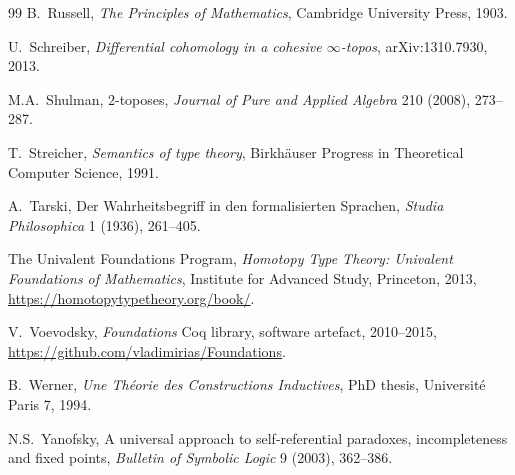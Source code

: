 \documentclass[11pt]{article}
\theoremstyle{plain}
\theoremstyle{definition}
\begin{document}
\begin{thebibliography}{99}
B.~Russell,
\newblock \emph{The Principles of Mathematics},
\newblock Cambridge University Press, 1903.

U.~Schreiber,
\newblock \emph{Differential cohomology in a cohesive $\infty$-topos},
\newblock arXiv:1310.7930, 2013.

M.A.~Shulman,
\newblock $2$-toposes,
\newblock \emph{Journal of Pure and Applied Algebra} 210 (2008), 273--287.

T.~Streicher,
\newblock \emph{Semantics of type theory},
\newblock Birkh\"auser Progress in Theoretical Computer Science, 1991.

A.~Tarski,
\newblock Der Wahrheitsbegriff in den formalisierten Sprachen,
\newblock \emph{Studia Philosophica} 1 (1936), 261--405.

The Univalent Foundations Program,
\newblock \emph{Homotopy Type Theory: Univalent Foundations of Mathematics},
\newblock Institute for Advanced Study, Princeton, 2013,
\newblock \url{https://homotopytypetheory.org/book/}.

V.~Voevodsky,
\newblock \emph{Foundations} Coq library,
\newblock software artefact, 2010--2015,
\newblock \url{https://github.com/vladimirias/Foundations}.

B.~Werner,
\newblock \emph{Une Th\'eorie des Constructions Inductives},
\newblock PhD thesis, Universit\'e Paris 7, 1994.

N.S.~Yanofsky,
\newblock A universal approach to self-referential paradoxes, incompleteness and fixed points,
\newblock \emph{Bulletin of Symbolic Logic} 9 (2003), 362--386.

\end{thebibliography}
\end{document}
